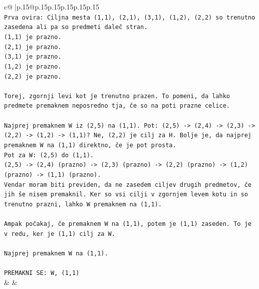\documentclass{article}
\begin{document}
{\begin{supertabular}{c@{$\;$}|p{.15\linewidth}@{}p{.15\linewidth}p{.15\linewidth}p{.15\linewidth}p{.15\linewidth}p{.15\linewidth}}
{{{\\ 
\texttt{Prva ovira: Ciljna mesta (1,1), (2,1), (3,1), (1,2), (2,2) so trenutno zasedena ali pa so predmeti daleč stran.} \\
\texttt{(1,1) je prazno.} \\
\texttt{(2,1) je prazno.} \\
\texttt{(3,1) je prazno.} \\
\texttt{(1,2) je prazno.} \\
\texttt{(2,2) je prazno.} \\
\\ 
\texttt{Torej, zgornji levi kot je trenutno prazen. To pomeni, da lahko predmete premaknem neposredno tja, če so na poti prazne celice.} \\
\\ 
\texttt{Najprej premaknem W iz (2,5) na (1,1). Pot: (2,5) {-}> (2,4) {-}> (2,3) {-}> (2,2) {-}> (1,2) {-}> (1,1)? Ne, (2,2) je cilj za H. Bolje je, da najprej premaknem W na (1,1) direktno, če je pot prosta.} \\
\texttt{Pot za W: (2,5) do (1,1).} \\
\texttt{(2,5) {-}> (2,4) (prazno) {-}> (2,3) (prazno) {-}> (2,2) (prazno) {-}> (1,2) (prazno) {-}> (1,1) (prazno).} \\
\texttt{Vendar moram biti previden, da ne zasedem ciljev drugih predmetov, če jih še nisem premaknil. Ker so vsi cilji v zgornjem levem kotu in so trenutno prazni, lahko W premaknem na (1,1).} \\
\\ 
\texttt{Ampak počakaj, če premaknem W na (1,1), potem je (1,1) zaseden. To je v redu, ker je (1,1) cilj za W.} \\
\\ 
\texttt{Najprej premaknem W na (1,1).} \\
\\ 
\texttt{PREMAKNI SE: W, (1,1)} \\
            }
        }
    }
    & & \\ \\


\end{supertabular}}
\end{document}
